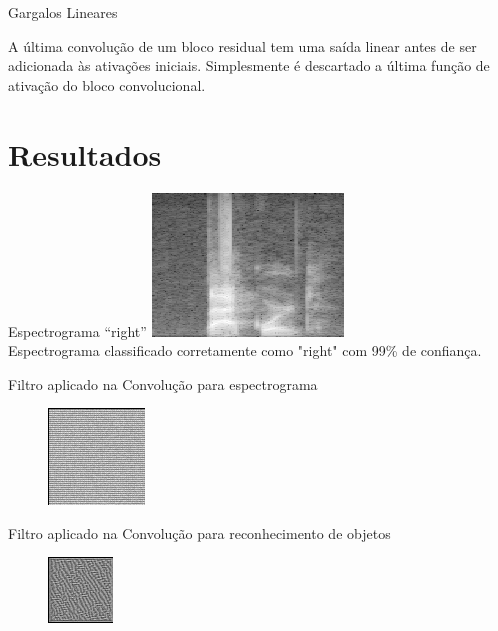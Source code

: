\documentclass[10pt, compress]{beamer}
\begin{document}
\begin{frame}{Gargalos Lineares}

A última convolução de um bloco residual tem uma \alert{saída linear} antes de ser adicionada às ativações iniciais. Simplesmente é descartado a última função de ativação do bloco convolucional.
\end{frame}

\section{Resultados} %

\begin{frame}{Espectrograma ``right''}
\centering
\includegraphics[scale=0.5]{images/process-2.png}\\
Espectrograma classificado corretamente como "right" com \alert{99\%} de confiança.
\end{frame}

\begin{frame}{Filtro aplicado na Convolução para espectrograma}
\begin{figure}
\centering
\includegraphics[scale=6]{images/filtrospeech.png} 
\end{figure}
\end{frame}

\begin{frame}{Filtro aplicado na Convolução para reconhecimento de objetos}
\begin{figure}
\centering
\includegraphics[scale=8]{images/filtroobj.png}
\end{figure}
\end{frame}
\end{document}
